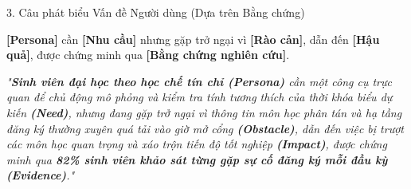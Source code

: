 \documentclass[aspectratio=169, 10pt]{beamer}
\begin{document}
\begin{frame}{3. Câu phát biểu Vấn đề Người dùng (Dựa trên Bằng chứng)}
    \begin{tcolorbox}[colback=PrimaryBlue!5, colframe=PrimaryBlue, title=Cấu trúc Chuẩn hóa (User Problem Statement Formula)]
        \centering\small
        \textbf{[Persona]} cần \textbf{[Nhu cầu]} nhưng gặp trở ngại vì \textbf{[Rào cản]}, dẫn đến \textbf{[Hậu quả]}, được chứng minh qua \textbf{[Bằng chứng nghiên cứu]}.
    \end{tcolorbox}
    
    \vspace{0.15cm}
    
    \begin{tcolorbox}[colback=CardBg, colframe=ThemeNavy, title=Phát biểu Cụ thể cho Sinh viên]
        \small
        \textit{"\textbf{Sinh viên đại học theo học chế tín chỉ (Persona)} cần một công cụ trực quan để chủ động mô phỏng và kiểm tra tính tương thích của thời khóa biểu dự kiến \textbf{(Need)}, nhưng đang gặp trở ngại vì thông tin môn học phân tán và hạ tầng đăng ký thường xuyên quá tải vào giờ mở cổng \textbf{(Obstacle)}, dẫn đến việc bị trượt các môn học quan trọng và xáo trộn tiến độ tốt nghiệp \textbf{(Impact)}, được chứng minh qua \textbf{82\% sinh viên khảo sát từng gặp sự cố đăng ký mỗi đầu kỳ (Evidence)}."}
    \end{tcolorbox}
\end{frame}
\end{document}
